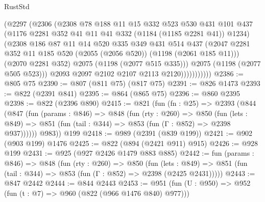 \begin{lexlean}{RustStd}
\begin{coremodule}
                      (@2297
                        (@2306
                          (@2308
                            @78
                            @188
                            @11
                            @15
                            @332
                            @523
                            @530
                            @431
                            @101
                            @437
                            (@1176 @2281 @352 @41 @11 @41 @332 (@1184 (@1185 @2281 @41)) @1234)
                            (@2308
                              @186
                              @87
                              @11
                              @14
                              @520
                              @335
                              @349
                              @431
                              @514
                              @437
                              (@2047
                                @2281
                                @352
                                @11
                                @185
                                @520
                                (@2055 (@2056 @520))
                                (@1198 (@2061 @185 @11)))
                              (@2070 @2281 @352)
                              @2075
                              (@1198 (@2077 @515 @335)))
                            @2075
                            (@1198 (@2077 @505 @523)))
                          @2093
                          @2097
                          @2102
                          @2107
                          @2113
                          @2120)))))))))))
@2386 := @805 @75
@2390 := @807 (@811 @75) (@817 @75)
@2391 := @826 @1473
@2393 := @822 (@2391 @841)
@2395 := @864 (@865 @75)
@2396 := @860 @2395
@2398 := @822 (@2396 @890)
@2415 := @821
    (fun (fn : @25) =>
    @2393
      (@844
        (@847
          (fun (params : @846) =>
          @848
            (fun (rty : @260) =>
            @850
              (fun (lets : @849) =>
              @851 (fun (tail : @344) => @853 (fun (Γ : @852) => @2398 @937))))))
        @983))
    @199
@2418 := @989 (@2391 (@839 @199))
@2421 := @902 (@903 @199) @1476
@2425 := @822 (@894 (@2421 @911) @915)
@2426 := @928 @199
@2431 := @925 (@927 @2426 @1479 @883 @885)
@2442 := fun (params : @846) =>
  @848
    (fun (rty : @260) =>
    @850
      (fun (lets : @849) =>
      @851 (fun (tail : @344) => @853 (fun (Γ : @852) => @2398 (@2425 @2431)))))
@2443 := @847 @2442
@2444 := @844 @2443
@2453 := @951 (fun (U : @950) => @952 (fun (t : @7) => @960 (@822 (@966 @1476 @840) @977)))

\end{coremodule}
\end{lexlean}
